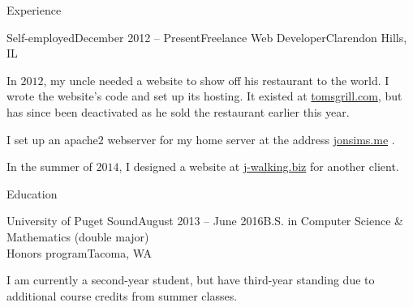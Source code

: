 \documentclass{resume} %
\begin{document}
\begin{rSection}{Experience}
\begin{rSubsection}{Self-employed}{December 2012 -- Present}{Freelance Web Developer}{Clarendon Hills, IL}
\item In $2012$, my uncle needed a website to show off his restaurant to the world. I wrote the website's code and set up its hosting. It existed at \url{tomsgrill.com}, but has since been deactivated as he sold the restaurant earlier this year.
\item I set up an apache$2$ webserver for my home server at the address \url{jonsims.me} .
\item In the summer of $2014$, I designed a website at \url{j-walking.biz} for another client.
\end{rSubsection}

\end{rSection}



\begin{rSection}{Education}
\begin{rSubsection}{University of Puget Sound}{August 2013 -- June 2016}{B.S. in Computer Science \& Mathematics (double major)\\Honors program}{Tacoma, WA} 
\item I am currently a second-year student, but have third-year standing due to additional course credits from summer classes.
\end{rSubsection}
\end{rSection}


\end{document}
